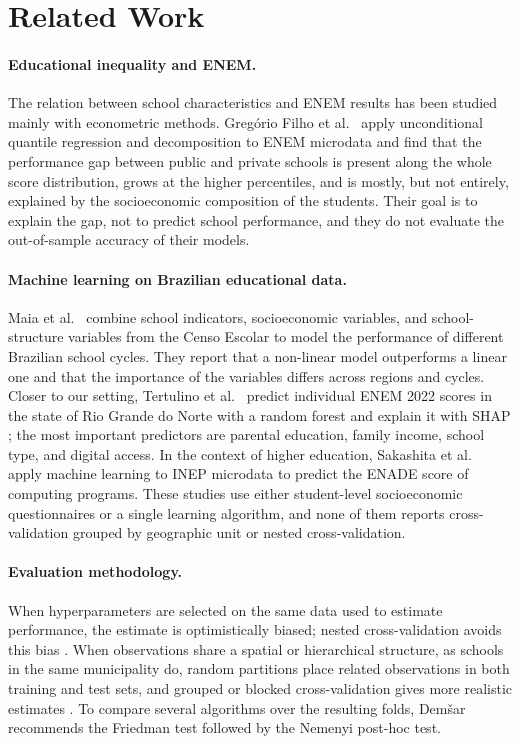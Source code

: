 \section{Related Work}
\label{sec:related-work}

\paragraph{Educational inequality and ENEM.}
The relation between school characteristics and ENEM results has been studied mainly with
econometric methods. Greg\'orio Filho et al.~\cite{gregorio2026hiato} apply unconditional
quantile regression and decomposition to ENEM microdata and find that the performance gap
between public and private schools is present along the whole score distribution, grows at the
higher percentiles, and is mostly, but not entirely, explained by the socioeconomic composition
of the students. Their goal is to explain the gap, not to predict school performance, and they
do not evaluate the out-of-sample accuracy of their models.

\paragraph{Machine learning on Brazilian educational data.}
Maia et al.~\cite{maia2021assessing} combine school indicators, socioeconomic variables, and
school-structure variables from the Censo Escolar to model the performance of different Brazilian
school cycles. They report that a non-linear model outperforms a linear one and that the
importance of the variables differs across regions and cycles. Closer to our setting,
Tertulino et al.~\cite{tertulino2026fatores} predict individual ENEM 2022 scores in the state of
Rio Grande do Norte with a random forest and explain it with SHAP \cite{lundberg2017unified}; the
most important predictors are parental education, family income, school type, and digital
access. In the context of higher education, Sakashita et al.~\cite{sakashita2023predicao} apply
machine learning to INEP microdata to predict the ENADE score of computing programs. These
studies use either student-level socioeconomic questionnaires or a single learning algorithm,
and none of them reports cross-validation grouped by geographic unit or nested
cross-validation.

\paragraph{Evaluation methodology.}
When hyperparameters are selected on the same data used to estimate performance, the estimate
is optimistically biased; nested cross-validation avoids this bias \cite{cawley2010overfitting}.
When observations share a spatial or hierarchical structure, as schools in the same municipality
do, random partitions place related observations in both training and test sets, and grouped or
blocked cross-validation gives more realistic estimates \cite{roberts2017crossvalidation}. To
compare several algorithms over the resulting folds, Dem\v{s}ar~\cite{demsar2006statistical}
recommends the Friedman test followed by the Nemenyi post-hoc test.

